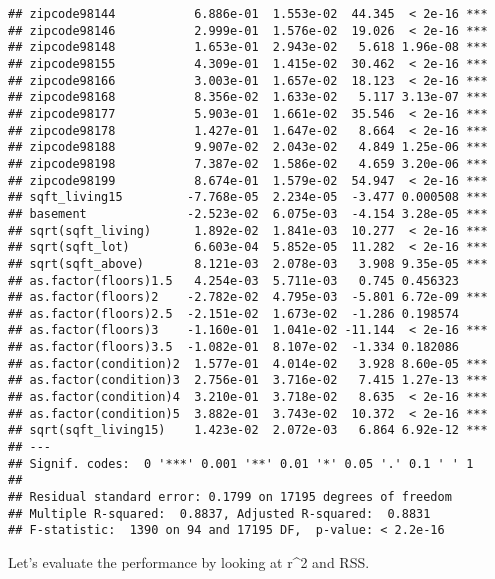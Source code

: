 \documentclass[]{article}
\newenvironment{Shaded}{\begin{snugshade}}{\end{snugshade}}
\newcommand{\KeywordTok}[1]{\textcolor[rgb]{0.13,0.29,0.53}{\textbf{#1}}}
\newcommand{\DecValTok}[1]{\textcolor[rgb]{0.00,0.00,0.81}{#1}}
\newcommand{\StringTok}[1]{\textcolor[rgb]{0.31,0.60,0.02}{#1}}
\newcommand{\OperatorTok}[1]{\textcolor[rgb]{0.81,0.36,0.00}{\textbf{#1}}}
\newcommand{\NormalTok}[1]{#1}
\begin{document}
\begin{verbatim}
## zipcode98144           6.886e-01  1.553e-02  44.345  < 2e-16 ***
## zipcode98146           2.999e-01  1.576e-02  19.026  < 2e-16 ***
## zipcode98148           1.653e-01  2.943e-02   5.618 1.96e-08 ***
## zipcode98155           4.309e-01  1.415e-02  30.462  < 2e-16 ***
## zipcode98166           3.003e-01  1.657e-02  18.123  < 2e-16 ***
## zipcode98168           8.356e-02  1.633e-02   5.117 3.13e-07 ***
## zipcode98177           5.903e-01  1.661e-02  35.546  < 2e-16 ***
## zipcode98178           1.427e-01  1.647e-02   8.664  < 2e-16 ***
## zipcode98188           9.907e-02  2.043e-02   4.849 1.25e-06 ***
## zipcode98198           7.387e-02  1.586e-02   4.659 3.20e-06 ***
## zipcode98199           8.674e-01  1.579e-02  54.947  < 2e-16 ***
## sqft_living15         -7.768e-05  2.234e-05  -3.477 0.000508 ***
## basement              -2.523e-02  6.075e-03  -4.154 3.28e-05 ***
## sqrt(sqft_living)      1.892e-02  1.841e-03  10.277  < 2e-16 ***
## sqrt(sqft_lot)         6.603e-04  5.852e-05  11.282  < 2e-16 ***
## sqrt(sqft_above)       8.121e-03  2.078e-03   3.908 9.35e-05 ***
## as.factor(floors)1.5   4.254e-03  5.711e-03   0.745 0.456323    
## as.factor(floors)2    -2.782e-02  4.795e-03  -5.801 6.72e-09 ***
## as.factor(floors)2.5  -2.151e-02  1.673e-02  -1.286 0.198574    
## as.factor(floors)3    -1.160e-01  1.041e-02 -11.144  < 2e-16 ***
## as.factor(floors)3.5  -1.082e-01  8.107e-02  -1.334 0.182086    
## as.factor(condition)2  1.577e-01  4.014e-02   3.928 8.60e-05 ***
## as.factor(condition)3  2.756e-01  3.716e-02   7.415 1.27e-13 ***
## as.factor(condition)4  3.210e-01  3.718e-02   8.635  < 2e-16 ***
## as.factor(condition)5  3.882e-01  3.743e-02  10.372  < 2e-16 ***
## sqrt(sqft_living15)    1.423e-02  2.072e-03   6.864 6.92e-12 ***
## ---
## Signif. codes:  0 '***' 0.001 '**' 0.01 '*' 0.05 '.' 0.1 ' ' 1
## 
## Residual standard error: 0.1799 on 17195 degrees of freedom
## Multiple R-squared:  0.8837, Adjusted R-squared:  0.8831 
## F-statistic:  1390 on 94 and 17195 DF,  p-value: < 2.2e-16
\end{verbatim}

Let's evaluate the performance by looking at r\^{}2 and RSS.

\begin{Shaded}
\end{Shaded}
\end{document}
